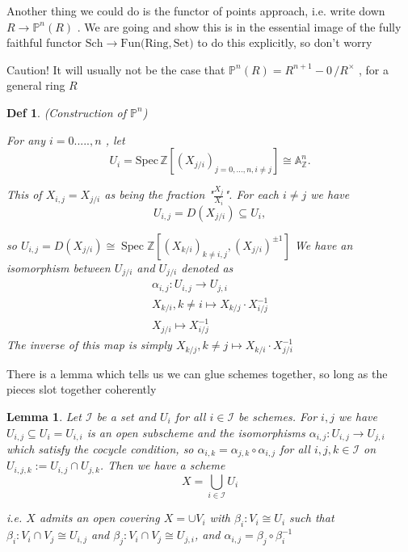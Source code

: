 \documentclass{article}
\newtheorem{definition}[theorem]{Def}
\newtheorem{lemma}[theorem]{Lemma}
\begin{document}
Another thing we could do is the functor of points approach, i.e. write down $R\to\mathbb{P}^{n}(R)$ . We are going and show this is in the essential image of the fully faithful functor $\mathrm{Sch}\to\mathrm{Fun}(\mathrm{Ring,Set)}$ 
to do this explicitly, so don't worry

Caution! It will usually not be the case that $\mathbb{P}^{n}(R)=R^{n+1}-0\,/R^{\times}$ , for a general ring ${\mathbf{}}R$ 

\begin{definition}
    (Construction of $\mathbb{P}^{n}$)
    
    For any $i=0.....,n$ , let
$$
U_{i}=\mathrm{Spec}\,\mathbb{Z}[(X_{j/i})_{j=0,...,n,i\neq j}]\cong\mathbb A_{\mathbb Z}^{n}. 
$$

This of $X_{i,j}=X_{j/i}$ as being the fraction "$\frac{X_{j}}{X_{i}}$". For each $i\ne j$ we have
$$
U_{i,j}=D(X_{j/i})\subseteq U_{i}, 
$$

so $U_{i,j}=D(X_{j/i})\cong\operatorname{Spec}\mathbb{Z}[(X_{k/i})_{k\not=i,j},(X_{j/i})^{\pm1}]$ We have an isomorphism between $U_{j/i}$ and $U_{j/i}$ denoted as
$$
\begin{array}{l}{{\alpha_{i,j}:U_{i,j} \rightarrow U_{j,i}}}\\ {{X_{k/i},k\neq i\mapsto X_{k/j}\cdot X_{i/j}^{-1}}}\\
X_{j/i}\mapsto X_{i/j}^{-1}
\end{array} 
$$
The inverse of this map is simply $X_{k/j},k\neq j\mapsto X_{k/i}\cdot X_{j/i}^{-1}$ 
\end{definition}

There is a lemma which tells us we can glue schemes together, so long as the pieces slot together coherently

\begin{lemma}
    Let $\mathcal I$ be a set and $U_i$ for all $i \in\mathcal I$ be schemes. For $i, j$ we have $U_{i,j} \subseteq U_i = U_{i,i}$
is an open subscheme and the isomorphisms $\alpha_{i,j} : U_{i,j} \to U_{j,i}$ which satisfy the cocycle condition, so
$\alpha_{i,k} = \alpha_{j,k} \circ \alpha_{i,j}$ for all $i, j, k \in\mathcal I$ on $U_{i,j,k} := U_{i,j} \cap U_{j,k}$. Then we have a scheme
$$
X=\bigcup_{i\in\mathcal I}U_i
$$

i.e. $X$ admits an open covering $X =\cup V_i$ with $\beta_i: V_i
\cong U_i$ such that $\beta_i: V_i \cap V_j
\cong U_{i,j}$ and
$\beta_j: V_i \cap V_j
\cong U_{j,i}$, and $\alpha_{i,j} = \beta_j \circ \beta_i^{-1}$
\end{lemma}
\end{document}
